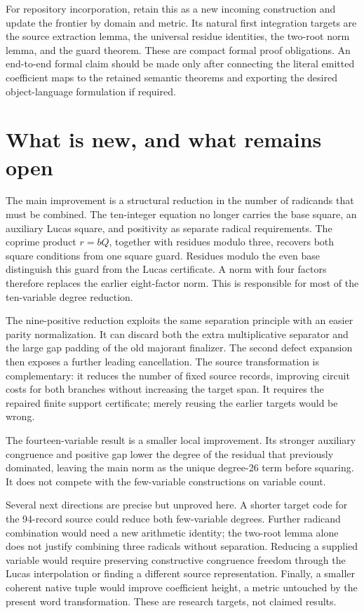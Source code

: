 \documentclass[11pt,a4paper]{article}
\theoremstyle{definition}\newtheorem{definition}[theorem]{Definition}
\theoremstyle{remark}\newtheorem{remark}[theorem]{Remark}
\begin{document}
For repository incorporation, retain this as a new incoming construction
and update the frontier by domain and metric. Its natural first integration
targets are the source extraction lemma, the universal residue identities,
the two-root norm lemma, and the guard theorem. These are compact formal
proof obligations. An end-to-end formal claim should be made only after
connecting the literal emitted coefficient maps to the retained semantic
theorems and exporting the desired object-language formulation if required.

\section{What is new, and what remains open}

The main improvement is a structural reduction in the number of radicands
that must be combined. The ten-integer equation no longer carries the base
square, an auxiliary Lucas square, and positivity as separate radical
requirements. The coprime product $r=bQ$, together with residues modulo
three, recovers both square conditions from one square guard. Residues
modulo the even base distinguish this guard from the Lucas certificate.
A norm with four factors therefore replaces the earlier eight-factor norm.
This is responsible for most of the ten-variable degree reduction.

The nine-positive reduction exploits the same separation principle with
an easier parity normalization. It can discard both the extra multiplicative
separator and the large gap padding of the old majorant finalizer. The
second defect expansion then exposes a further leading cancellation. The
source transformation is complementary: it reduces the number of fixed
source records, improving circuit costs for both branches without
increasing the target span. It requires the repaired finite support
certificate; merely reusing the earlier targets would be wrong.

The fourteen-variable result is a smaller local improvement. Its stronger
auxiliary congruence and positive gap lower the degree of the residual that
previously dominated, leaving the main norm as the unique degree-26 term
before squaring. It does not compete with the few-variable constructions
on variable count.

Several next directions are precise but unproved here. A shorter target
code for the 94-record source could reduce both few-variable degrees.
Further radicand combination would need a new arithmetic identity; the
two-root lemma alone does not justify combining three radicals without
separation. Reducing a supplied variable would require preserving
constructive congruence freedom through the Lucas interpolation or finding
a different source representation. Finally, a smaller coherent native
tuple would improve coefficient height, a metric untouched by the present
word transformation. These are research targets, not claimed results.
\end{document}

